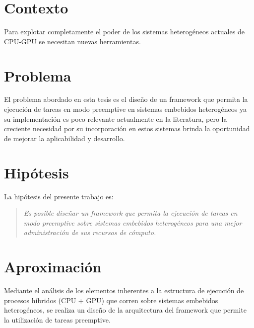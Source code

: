 
\section{Contexto}

Para explotar completamente el poder de los sistemas heterogéneos actuales de CPU-GPU se necesitan nuevas herramientas.

\section{Problema}

El problema abordado en esta tesis es el diseño de un framework que permita la ejecución de tareas en modo preemptive en sistemas embebidos heterogéneos ya su implementación es poco relevante actualmente en la literatura, pero la creciente necesidad por su incorporación en estos sistemas brinda la oportunidad de mejorar la aplicabilidad y desarrollo. 

\section{Hipótesis}

La hipótesis del presente trabajo es:

\begin{quote}
\textit{Es posible diseñar un framework que permita la ejecución de tareas en modo preemptive sobre sistemas embebidos heterogéneos para una mejor administración de sus recursos de cómputo.}
\end{quote}


\section{Aproximación}

Mediante el análisis de los elementos inherentes a la estructura de ejecución de procesos híbridos (CPU + GPU) que corren sobre sistemas embebidos heterogéneos, se realiza un diseño de la arquitectura del framework que permite la utilización de tareas preemptive.

